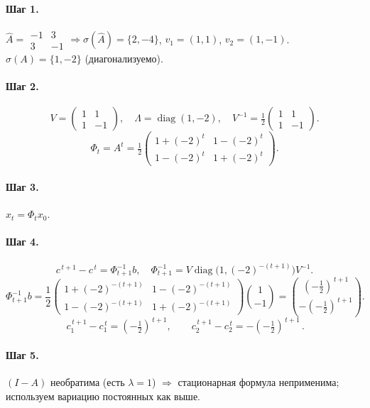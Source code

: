 \paragraph{Шаг 1.} \(\widehat{A}=\begin{smallmatrix}-1&3\\ 3&-1\end{smallmatrix}\Rightarrow \sigma(\widehat{A})=\{2,-4\}\), \(v_1=(1,1)\), \(v_2=(1,-1)\).  
\(\sigma(A)=\{1,-2\}\) (диагонализуемо).

\paragraph{Шаг 2.}
\[
V=\begin{pmatrix}1&1\\ 1&-1\end{pmatrix},\quad
\Lambda=\operatorname{diag}(1,-2),\quad
V^{-1}=\tfrac12\begin{pmatrix}1&1\\ 1&-1\end{pmatrix}.
\]
\[
\Phi_t=A^t=\tfrac12\begin{pmatrix}1+(-2)^t & 1-(-2)^t\\ 1-(-2)^t & 1+(-2)^t\end{pmatrix}.
\]

\paragraph{Шаг 3.} \(x_t=\Phi_t x_0\).

\paragraph{Шаг 4.}
\[
c^{\,t+1}-c^{\,t}=\Phi_{t+1}^{-1}b,\quad
\Phi_{t+1}^{-1}=V\operatorname{diag}\!\bigl(1,(-2)^{-(t+1)}\bigr)V^{-1}.
\]
\[
\Phi_{t+1}^{-1}b=\frac12\!\begin{pmatrix}1+(-2)^{-(t+1)} & 1-(-2)^{-(t+1)}\\ 1-(-2)^{-(t+1)} & 1+(-2)^{-(t+1)}\end{pmatrix}\!\!\binom{1}{-1}
=\binom{(-\tfrac12)^{\,t+1}}{-(-\tfrac12)^{\,t+1}}.
\]
\[
\boxed{\,c_1^{\,t+1}-c_1^{\,t}=(-\tfrac12)^{\,t+1},\qquad c_2^{\,t+1}-c_2^{\,t}=-(-\tfrac12)^{\,t+1}\,}.
\]

\paragraph{Шаг 5.} \((I-A)\) необратима (есть \(\lambda=1\)) \(\Rightarrow\) стационарная формула неприменима; используем вариацию постоянных как выше.